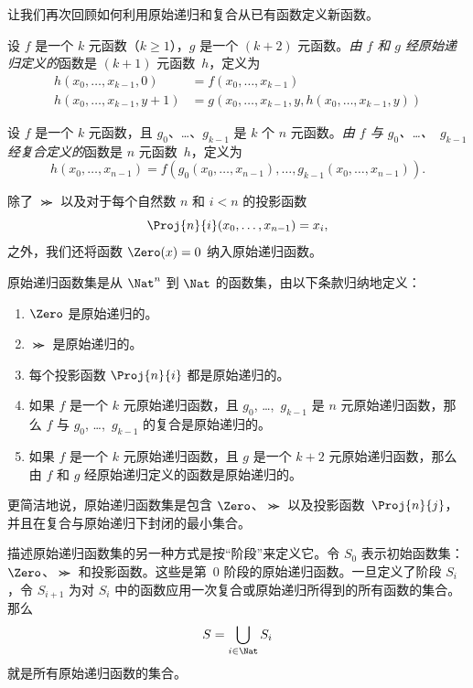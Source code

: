 \documentclass[../../../include/open-logic-section]{subfiles}
\begin{document}

让我们再次回顾如何利用原始递归和复合从已有函数定义新函数。

\begin{defn}
   设 $f$ 是一个 $k$ 元函数（$k\ge 1$），$g$ 是一个 $(k+2)$ 元函数。\emph{由 $f$ 和 $g$ 经原始递归定义的}函数是 $(k+1)$ 元函数~$h$，定义为
  \begin{align*}
    h(x_0,\dots,x_{k-1},0) & =  f(x_0,\dots,x_{k-1}) \\
    h(x_0,\dots,x_{k-1},y+1) & = g(x_0,\dots,x_{k-1}, y, h(x_0,\dots,x_{k-1}, y))
  \end{align*}
\end{defn}

\begin{defn}
   设 $f$ 是一个 $k$ 元函数，且 $g_0$、\dots、$g_{k-1}$ 是 $k$ 个 $n$ 元函数。\emph{由 $f$ 与 $g_0$、\dots、~$g_{k-1}$ 经复合定义的}函数是 $n$ 元函数~$h$，定义为
  \[
  h(x_0, \dots, x_{n-1}) =
  f(g_0(x_0, \dots, x_{n-1}), \dots, g_{k-1}(x_0, \dots, x_{n-1})).
  \]
\end{defn}

除了 $\Succ$ 以及对于每个自然数 $n$ 和 $i < n$ 的投影函数
\[
\Proj{n}{i}(x_0,\dots,x_{n-1}) = x_i,
\]
之外，我们还将函数 $\Zero(x) = 0$ 纳入原始递归函数。

\begin{defn}
  原始递归函数集是从 $\Nat^n$ 到 $\Nat$ 的函数集，由以下条款归纳地定义：
  \begin{enumerate}
  \item $\Zero$ 是原始递归的。
  \item $\Succ$ 是原始递归的。
  \item 每个投影函数 $\Proj{n}{i}$ 都是原始递归的。
  \item 如果 $f$ 是一个 $k$ 元原始递归函数，且 $g_0$,
    \dots,~$g_{k-1}$ 是 $n$ 元原始递归函数，那么 $f$ 与 $g_0$, \dots,~$g_{k-1}$ 的复合是原始递归的。
  \item 如果 $f$ 是一个 $k$ 元原始递归函数，且 $g$ 是一个
    $k+2$ 元原始递归函数，那么由 $f$ 和 $g$ 经原始递归定义的函数是原始递归的。
\end{enumerate}
\end{defn}

\begin{explain}
更简洁地说，原始递归函数集是包含 $\Zero$、$\Succ$ 以及投影函数~$\Proj{n}{j}$，并且在复合与原始递归下封闭的最小集合。

描述原始递归函数集的另一种方式是按“阶段”来定义它。令 $S_0$ 表示初始函数集：$\Zero$、$\Succ$ 和投影函数。这些是第~$0$ 阶段的原始递归函数。一旦定义了阶段 $S_i$，令 $S_{i+1}$ 为对 $S_i$ 中的函数应用一次复合或原始递归所得到的所有函数的集合。那么
\[
S = \bigcup_{i \in \Nat} S_i
\]
就是所有原始递归函数的集合。
\end{explain}
\end{document}
